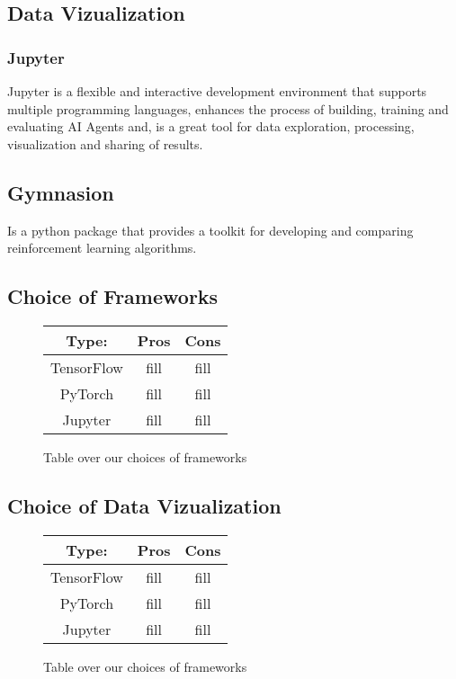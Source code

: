 \subsection{Data Vizualization}

\subsubsection{Jupyter}
Jupyter is a flexible and interactive development environment that supports multiple 
programming languages, enhances the process of building, training and evaluating AI Agents and,
is a great tool for data exploration, processing, visualization and sharing of results.

\subsection{Gymnasion}
Is a python package that provides a toolkit for developing and comparing reinforcement learning algorithms.

\subsection{Choice of Frameworks}

\begin{figure}[h]
      \centering
      \begin{tabular}{ |c|c|c| }
            \hline
            Type:       & Pros & Cons \\
            \hline
            TensorFlow  & fill & fill \\
            \hline
            PyTorch     & fill & fill \\
            \hline
            Jupyter     & fill & fill \\
            \hline 
      \end{tabular}
      \caption{Table over our choices of frameworks}
      \label{tab:frameworks}      
\end{figure}

\subsection{Choice of Data Vizualization}

\begin{figure}[h]
      \centering
      \begin{tabular}{ |c|c|c| }
            \hline
            Type:       & Pros & Cons \\
            \hline
            TensorFlow  & fill & fill \\
            \hline
            PyTorch     & fill & fill \\
            \hline
            Jupyter     & fill & fill \\
            \hline 
      \end{tabular}
      \caption{Table over our choices of frameworks}
      \label{tab:frameworks}      
\end{figure}



